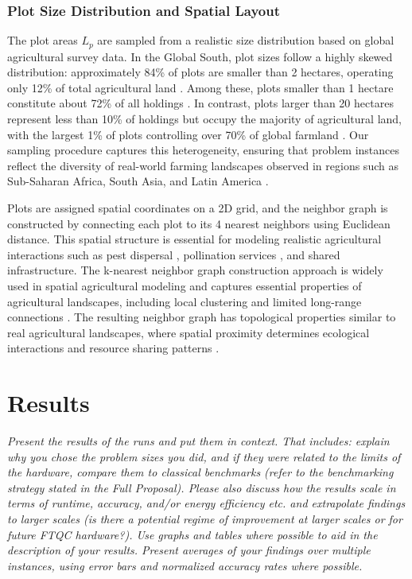 \documentclass{oqireport}
\begin{document}
\subsubsection{Plot Size Distribution and Spatial Layout}
The plot areas $L_p$ are sampled from a realistic size distribution based on global agricultural survey data. In the Global South, plot sizes follow a highly skewed distribution: approximately 84\% of plots are smaller than 2 hectares, operating only 12\% of total agricultural land \cite{lowder2016number, lowder2021farms}. Among these, plots smaller than 1 hectare constitute about 72\% of all holdings \cite{fao2014farms}. In contrast, plots larger than 20 hectares represent less than 10\% of holdings but occupy the majority of agricultural land, with the largest 1\% of plots controlling over 70\% of global farmland \cite{lowder2021farms}. Our sampling procedure captures this heterogeneity, ensuring that problem instances reflect the diversity of real-world farming landscapes observed in regions such as Sub-Saharan Africa, South Asia, and Latin America \cite{samberg2016subnational}.

Plots are assigned spatial coordinates on a 2D grid, and the neighbor graph is constructed by connecting each plot to its 4 nearest neighbors using Euclidean distance. This spatial structure is essential for modeling realistic agricultural interactions such as pest dispersal \cite{garzon2022methodological}, pollination services \cite{ponisio2015spatial, rahimi2021estimating}, and shared infrastructure. The k-nearest neighbor graph construction approach is widely used in spatial agricultural modeling \cite{zhang2024efficient, finley2006forest} and captures essential properties of agricultural landscapes, including local clustering and limited long-range connections \cite{cranmer2012landscape}. The resulting neighbor graph has topological properties similar to real agricultural landscapes, where spatial proximity determines ecological interactions and resource sharing patterns \cite{moreira2018plant, chacon2015landscape}.


\newpage

\section{Results}
\label{sec:results}

\textit{
Present the results of the runs and put them in context. That includes: explain why you chose the problem sizes you did, and if they were related to the limits of the hardware, compare them to classical benchmarks (refer to the benchmarking strategy stated in the Full Proposal). Please also discuss how the results scale in terms of runtime, accuracy, and/or energy efficiency etc. and extrapolate findings to larger scales (is there a potential regime of \textit{improvement} at larger scales or for future FTQC hardware?). 
Use graphs and tables where possible to aid in the description of your results. Present averages of your findings over multiple instances, using error bars and normalized accuracy rates where possible.
}
\end{document}
